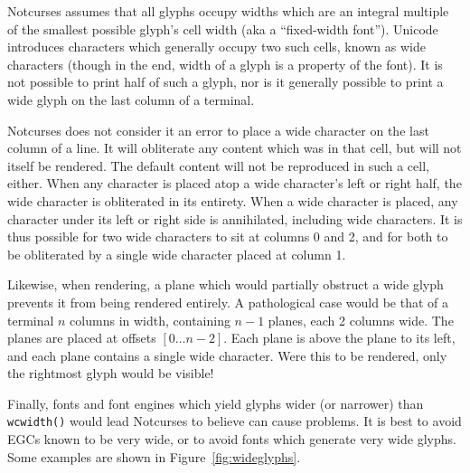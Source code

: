 \documentclass[letterpaper,10pt]{article}
\begin{document}
Notcurses assumes that all glyphs occupy widths which are an integral multiple
of the smallest possible glyph's cell width (aka a ``fixed-width font'').
Unicode introduces characters which generally occupy two such cells, known as
wide characters (though in the end, width of a glyph is a property of the
font). It is not possible to print half of such a glyph, nor is it generally
possible to print a wide glyph on the last column of a terminal.

Notcurses does not consider it an error to place a wide character on the last
column of a line. It will obliterate any content which was in that cell, but
will not itself be rendered. The default content will not be reproduced in such
a cell, either. When any character is placed atop a wide character's left or
right half, the wide character is obliterated in its entirety. When a wide
character is placed, any character under its left or right side is annihilated,
including wide characters. It is thus possible for two wide characters to sit
at columns 0 and 2, and for both to be obliterated by a single wide character
placed at column 1.

Likewise, when rendering, a plane which would partially obstruct a wide glyph
prevents it from being rendered entirely. A pathological case would be that of
a terminal $n$ columns in width, containing $n-1$ planes, each 2 columns wide.
The planes are placed at offsets $[0\ldots n-2]$. Each plane is above the plane to
its left, and each plane contains a single wide character. Were this to be
rendered, only the rightmost glyph would be visible!

Finally, fonts and font engines which yield glyphs wider (or narrower) than
\texttt{wcwidth()} would lead Notcurses to believe can cause problems. It is
best to avoid EGCs known to be very wide, or to avoid fonts which generate very
wide glyphs. Some examples are shown in Figure~\ref{fig:wideglyphs}.
\end{document}
